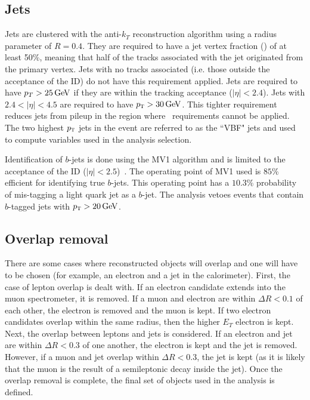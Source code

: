 \subsection{Jets}

Jets are clustered with the anti-$k_T$ reconstruction algorithm using a radius parameter of $R=0.4$. They are required to have a jet vertex fraction (\jvf) of at least 50\%, meaning that half of the tracks associated with the jet originated from the primary vertex. Jets with no tracks associated (i.e. those outside the acceptance of the ID) do not have this requirement applied. Jets are required to have $p_{T} > 25 \GeV$ if they are within the tracking acceptance ($|\eta| < 2.4$). Jets with $2.4 < |\eta| < 4.5$ are required to have $\pT > 30 \GeV$. This tighter requirement reduces jets from pileup in the region where \jvf\, requirements cannot be applied. The two highest $p_{\textrm{\footnotesize\sc t}}$ jets in the event are referred to as the ``VBF" jets and used to compute variables used in the analysis selection. 

Identification of $b$-jets is done using the MV1 algorithm and is limited to the acceptance of the ID ($|\eta| < 2.5$)~\cite{Run1BJets}. The operating point of MV1 used is $85$\% efficient for identifying true $b$-jets. This operating point has a $10.3$\% probability of mis-tagging a light quark jet as a $b$-jet. The analysis vetoes events that contain $b$-tagged jets with $\pT > 20 \GeV$. 

\subsection{Overlap removal}

There are some cases where reconstructed objects will overlap and one will have to be chosen (for example, an electron and a jet in the calorimeter). First, the case of lepton overlap is dealt with. If an electron candidate extends into the muon spectrometer, it is removed. If a muon and electron are within $\Delta R < 0.1$ of each other, the electron is removed and the muon is kept. If two electron candidates overlap within the same radius, then the higher $E_{T}$ electron is kept. Next, the overlap between leptons and jets is considered. If an electron and jet are within $\Delta R < 0.3$ of one another, the electron is kept and the jet is removed. However, if a muon and jet overlap within $\Delta R < 0.3$, the jet is kept (as it is likely that the muon is the result of a semileptonic decay inside the jet). Once the overlap removal is complete, the final set of objects used in the analysis is defined. 

